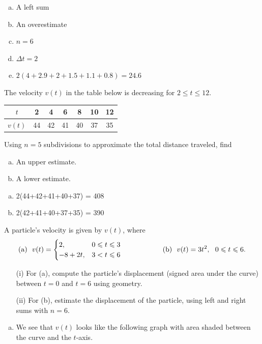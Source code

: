 \documentclass[11pt]{exam}
\begin{document}
\begin{questions}
\begin{solution}
  \begin{enumerate}[(a)]
  \item A left sum
  \item An overestimate
  \item \(n=6\)
  \item \(\Delta t = 2\) 
  \item \(2(4+2.9+2+1.5+1.1+0.8) = 24.6\)
  \end{enumerate}
\end{solution}
\question The velocity $v(t)$ in the table below is decreasing for $2 \leqslant t \leqslant 12$. 
\begin{center}
\begin{tabular}{|c|c|c|c|c|c|c|}
\hline
$t$ &2 & 4& 6& 8 & 10 & 12  \\
\hline
$v(t)$ &  44 & 42 & 41 & 40 & 37 & 35   \\
\hline
\end{tabular}
\end{center}

Using $n = 5$ subdivisions to approximate the total distance traveled, find

\begin{enumerate}[(a)]
\item An upper estimate.
\item A lower estimate.
\end{enumerate}
\begin{solution}
  \begin{enumerate}[(a)]
  \item 2(44+42+41+40+37) = 408
  \item 2(42+41+40+37+35) = 390
  \end{enumerate}
\end{solution}
\pagebreak
\question A particle's velocity is given by $v(t)$, where
\begin{equation*}
	\textnormal{(a)}\ \ v(t)=\begin{cases}
	2,&0\leqslant t\leqslant 3\\
	-8+2t,&3<t\leqslant 6
	\end{cases}\hspace{2cm}\textnormal{(b)}\ \ v(t)=3t^2,\ \ 0\leqslant t\leqslant 6.
\end{equation*}
\begin{enumerate}
	\item[(i)] For (a), compute the particle's displacement (signed area under the curve) between $t=0$ and $t=6$ using geometry.
	\item[(ii)]  For (b), estimate the displacement of the particle, using left and right sums with $n=6$.
\end{enumerate}
\begin{solution}
  \begin{enumerate}[(a)]
  \item We see that \(v(t)\) looks like the following graph with area
    shaded
    between the curve and the \(t\)-axis. \\


\end{enumerate}
\end{solution}
\end{questions}
\end{document}
